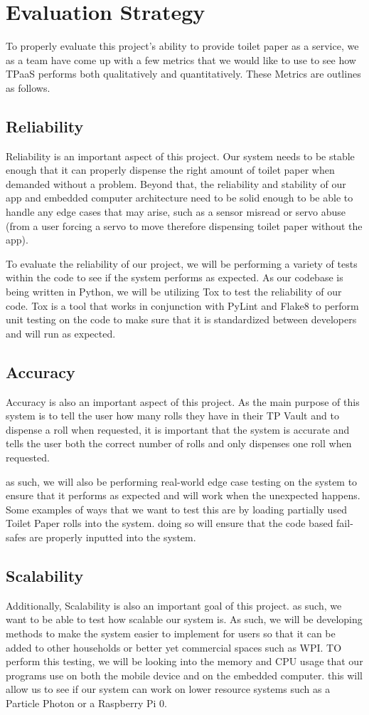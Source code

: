 \section{Evaluation Strategy}
To properly evaluate this project's ability to provide toilet paper as a service, we as a team have come up with a few metrics that we would like to use to see how TPaaS performs both qualitatively and quantitatively. These Metrics are outlines as follows.
\subsection{Reliability}
Reliability is an important aspect of this project. Our system needs to be stable enough that it can properly dispense the right amount of toilet paper when demanded without a problem. Beyond that, the reliability and stability of our app and embedded computer architecture need to be solid enough to be able to handle any edge cases that may arise, such as a sensor misread or servo abuse (from a user forcing a servo to move therefore dispensing toilet paper without the app).

To evaluate the reliability of our project, we will be performing a variety of tests within the code to see if the system performs as expected. As our codebase is being written in Python, we will be utilizing Tox to test the reliability of our code. Tox is a tool that works in conjunction with PyLint and Flake8 to perform unit testing on the code to make sure that it is standardized between developers and will run as expected. 

\subsection{Accuracy}
Accuracy is also an important aspect of this project. As the main purpose of this system is to tell the user how many rolls they have in their TP Vault and to dispense a roll when requested, it is important that the system is accurate and tells the user both the correct number of rolls and only dispenses one roll when requested.

as such, we will also be performing real-world edge case testing on the system to ensure that it performs as expected and will work when the unexpected happens. Some examples of ways that we want to test this are by loading partially used Toilet Paper rolls into the system. doing so will ensure that the code based fail-safes are properly inputted into the system. 
\subsection{Scalability}
Additionally, Scalability is also an important goal of this project. as such, we want to be able to test how scalable our system is. As such, we will be developing methods to make the system easier to implement for users so that it can be added to other households or better yet commercial spaces such as WPI. 
TO perform this testing, we will be looking into the memory and CPU usage that our programs use on both the mobile device and on the embedded computer. this will allow us to see if our system can work on lower resource systems such as a Particle Photon or a Raspberry Pi 0.
